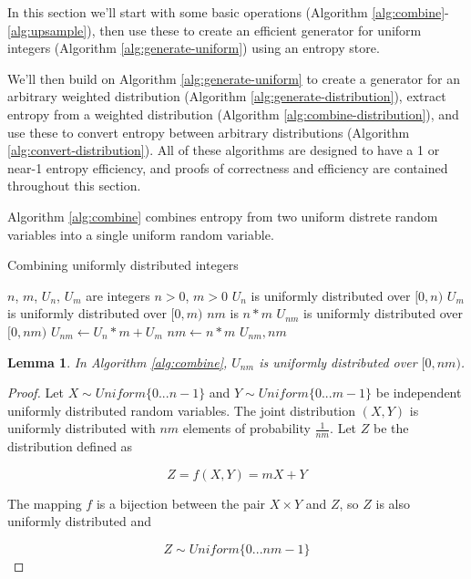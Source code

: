\documentclass[12pt]{article}
\newtheorem{lemma}{Lemma}
\begin{document}
In this section we'll start with some basic operations (Algorithm \ref{alg:combine}-\ref{alg:upsample}), then use these to create an efficient generator for uniform integers (Algorithm \ref{alg:generate-uniform}) using an entropy store.

We'll then build on Algorithm \ref{alg:generate-uniform} to create a generator for an arbitrary weighted distribution (Algorithm \ref{alg:generate-distribution}), extract entropy from a weighted distribution (Algorithm \ref{alg:combine-distribution}), and use these to convert entropy between arbitrary distributions (Algorithm \ref{alg:convert-distribution}). All of these algorithms are designed to have a 1 or near-1 entropy efficiency, and proofs of correctness and efficiency are contained throughout this section.

Algorithm \ref{alg:combine} combines entropy from two uniform distrete random variables into a single uniform random variable.

\begin{algorithm}
\caption{Combining uniformly distributed integers}
\label{alg:combine}
\begin{algorithmic}[1]
    \Require $n$, $m$, $U_n$, $U_m$ are integers
    \Require $n>0$, $m>0$
    \Require $U_n$ is uniformly distributed over $[0,n)$
    \Require $U_m$ is uniformly distributed over $[0,m)$
    \Ensure $nm$ is $n * m$
    \Ensure $U_{nm}$ is uniformly distributed over $[0,nm)$
  \State $U_{nm} \gets U_n * m + U_m$
  \State $nm \gets n * m$
  \State \Return $U_{nm}, nm$
\EndProcedure
\end{algorithmic}
\end{algorithm}

\begin{lemma}
In Algorithm \ref{alg:combine}, $U_{nm}$ is uniformly distributed over $[0,nm)$.
\label{lem:combine}
\end{lemma}

\begin{proof}
Let $X \sim Uniform \{0 ... n-1\}$ and $Y \sim Uniform\{0 ... m-1\}$ be independent uniformly distributed random variables. The joint distribution $(X,Y)$ is uniformly distributed with $nm$ elements of probability $\frac{1}{nm}$. Let $Z$ be the distribution defined as

\begin{equation}
Z = f(X,Y) = mX+Y
\end{equation}

The mapping $f$ is a bijection between the pair $X \times Y$ and $Z$, so $Z$ is also uniformly distributed and 

\begin{equation}
Z \sim Uniform \{0 ... nm-1\}
\end{equation}
\end{proof}
\end{document}
